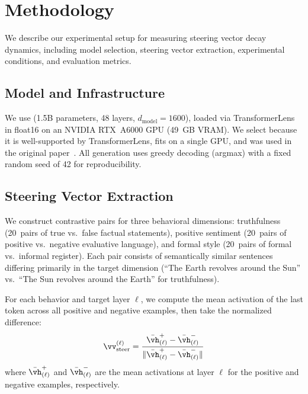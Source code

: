 \section{Methodology}
\label{sec:methodology}

We describe our experimental setup for measuring steering vector decay dynamics,
including model selection, steering vector extraction, experimental conditions,
and evaluation metrics.

\subsection{Model and Infrastructure}
\label{sec:model}

We use \gptxl (1.5B parameters, 48 layers, $d_{\text{model}} = 1600$), loaded
via TransformerLens~\citep{nanda2022transformerlens} in float16 on an NVIDIA
RTX~A6000 GPU (49~GB VRAM). We select \gptxl because it is well-supported by
TransformerLens, fits on a single GPU, and was used in the original \actadd
paper~\citep{turner2023actadd}. All generation uses greedy decoding (argmax)
with a fixed random seed of 42 for reproducibility.

\subsection{Steering Vector Extraction}
\label{sec:extraction}

We construct contrastive pairs for three behavioral dimensions: truthfulness
(20~pairs of true vs.\ false factual statements), positive sentiment
(20~pairs of positive vs.\ negative evaluative language), and formal style
(20~pairs of formal vs.\ informal register). Each pair consists of semantically
similar sentences differing primarily in the target dimension (\eg ``The Earth
revolves around the Sun'' vs.\ ``The Sun revolves around the Earth'' for
truthfulness).

For each behavior and target layer $\ell$, we compute the mean activation of
the last token across all positive and negative examples, then take the
normalized difference:
\begin{equation}
\steeringvec^{(\ell)} = \frac{\bar{\vh}^{+}_{(\ell)} - \bar{\vh}^{-}_{(\ell)}}
{\|\bar{\vh}^{+}_{(\ell)} - \bar{\vh}^{-}_{(\ell)}\|}
\label{eq:sv_extraction}
\end{equation}
where $\bar{\vh}^{+}_{(\ell)}$ and $\bar{\vh}^{-}_{(\ell)}$ are the mean
activations at layer $\ell$ for the positive and negative examples, respectively.

